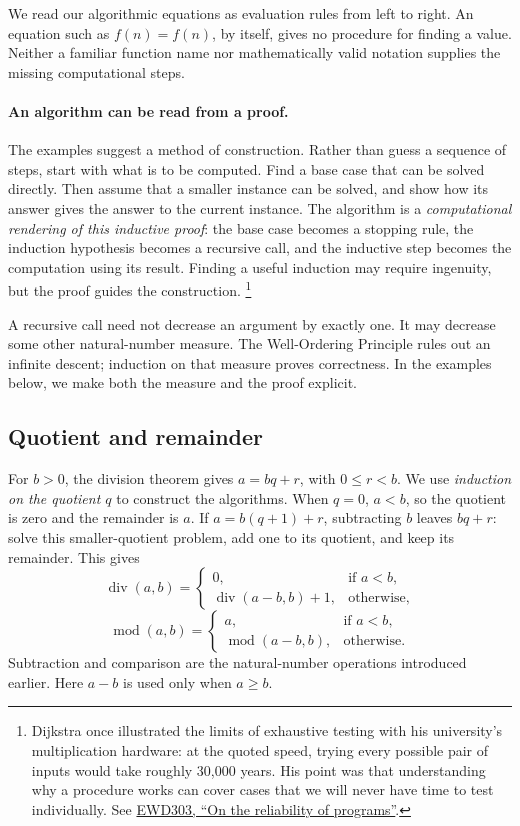We read our algorithmic equations as evaluation rules from left to right.
An equation such as $f(n)=f(n)$, by itself, gives no procedure for finding a
value. Neither a familiar function name nor mathematically valid notation
supplies the missing computational steps.

\paragraph{An algorithm can be read from a proof.}
The examples suggest a method of construction. Rather than guess a sequence
of steps, start with what is to be computed. Find a base case that can
be solved directly. Then assume that a smaller instance can be solved, and
show how its answer gives the answer to the current instance. The algorithm
is a \emph{computational rendering of this inductive proof}: the base case
becomes a stopping rule, the induction hypothesis becomes a recursive call,
and the inductive step becomes the computation using its result. Finding a
useful induction may require ingenuity, but the proof guides the construction.
\footnote{Dijkstra once illustrated the limits of exhaustive testing with
his university's multiplication hardware: at the quoted speed, trying every
possible pair of inputs would take roughly 30,000 years. His point was that
understanding why a procedure works can cover cases that we will never have
time to test individually. See
\href{https://www.cs.utexas.edu/~EWD/transcriptions/EWD03xx/EWD303.html}{EWD303,
``On the reliability of programs''}.}

A recursive call need not decrease an argument by exactly one. It may
decrease some other natural-number measure. The Well-Ordering Principle
rules out an infinite descent; induction on that measure proves correctness.
In the examples below, we make both the measure and the proof explicit.

\subsection{Quotient and remainder}
\label{sec:alg-division}

For $b>0$, the division theorem gives $a=bq+r$, with $0\leq r<b$.
We use \emph{induction on the quotient $q$} to construct the algorithms.
When $q=0$, $a<b$, so the quotient is zero and the remainder is $a$.
If $a=b(q+1)+r$, subtracting $b$ leaves $bq+r$: solve this smaller-quotient
problem, add one to its quotient, and keep its remainder. This gives
\[
\operatorname{div}(a,b)=\begin{cases}
0,&\text{if }a<b,\\
\operatorname{div}(a-b,b)+1,&\text{otherwise},
\end{cases}
\]
\[
\operatorname{mod}(a,b)=\begin{cases}
a,&\text{if }a<b,\\
\operatorname{mod}(a-b,b),&\text{otherwise}.
\end{cases}
\]
Subtraction and comparison are the natural-number operations introduced
earlier. Here $a-b$ is used only when $a\geq b$.

